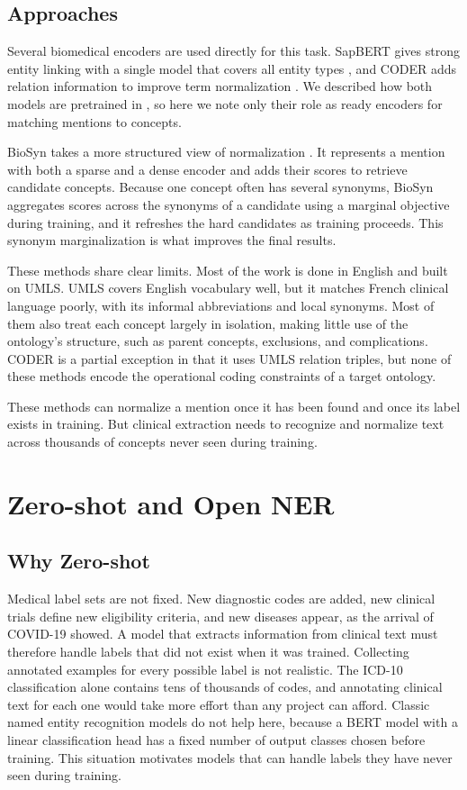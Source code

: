 \subsection{Approaches}

Several biomedical encoders are used directly for this task. SapBERT gives strong entity
linking with a single model that covers all entity types \citep{liu2021sapbert}, and CODER
adds relation information to improve term normalization \citep{yuan2022coder}. We described how
both models are pretrained in , so here we note only their role as
ready encoders for matching mentions to concepts.

BioSyn takes a more structured view of normalization \citep{sung2020biosyn}. It represents a
mention with both a sparse and a dense encoder and adds their scores to retrieve candidate
concepts. Because one concept often has several synonyms, BioSyn aggregates scores across the
synonyms of a candidate using a marginal objective during training, and it refreshes the hard
candidates as training proceeds. This synonym marginalization is what improves the final
results.

These methods share clear limits. Most of the work is done in English and built on UMLS. UMLS
covers English vocabulary well, but it matches French clinical language poorly, with its
informal abbreviations and local synonyms. Most of them also treat each concept largely in
isolation, making little use of the ontology's structure, such as parent concepts, exclusions,
and complications. CODER is a partial exception in that it uses UMLS relation triples, but none
of these methods encode the operational coding constraints of a target ontology.

These methods can normalize a mention once it has been found and once its label exists in
training. But clinical extraction needs to recognize and normalize text across thousands of
concepts never seen during training.
\section{Zero-shot and Open NER}
\label{sec:ie-zeroshot}

\subsection{Why Zero-shot}

Medical label sets are not fixed. New diagnostic codes are added, new clinical trials define
new eligibility criteria, and new diseases appear, as the arrival of COVID-19 showed. A model
that extracts information from clinical text must therefore handle labels that did not exist
when it was trained. Collecting annotated examples for every possible label is not realistic.
The ICD-10 classification alone contains tens of thousands of codes, and annotating clinical text
for each one would take more effort than any project can afford. Classic named entity
recognition models do not help here, because a BERT model with a linear classification head
has a fixed number of output classes chosen before training. This situation motivates models
that can handle labels they have never seen during training.

